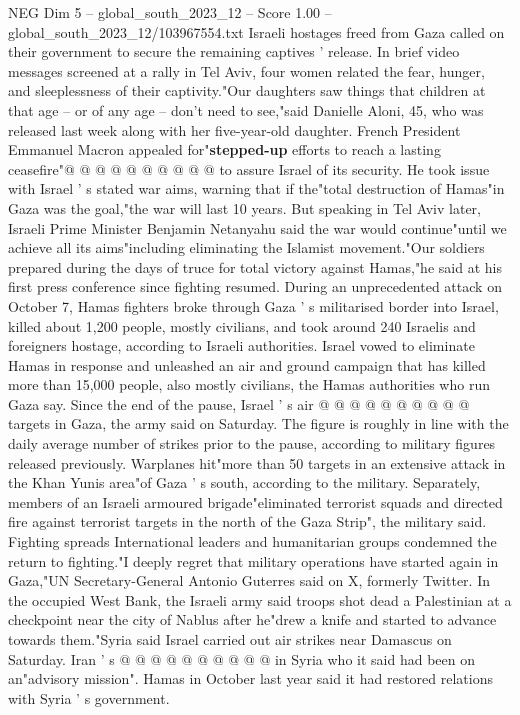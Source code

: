\begin{textsample}{NEG Dim 5 – global\_south\_2023\_12 – Score 1.00 – global\_south\_2023\_12/103967554.txt}
Israeli hostages freed from Gaza called on their government to secure the remaining captives ' release.
In brief video messages screened at a rally in Tel Aviv, four women related the fear, hunger, and sleeplessness of their captivity."Our daughters saw things that children at that age -- or of any age -- don't need to see,"said Danielle Aloni, 45, who was released last week along with her five-year-old daughter.
French President Emmanuel Macron appealed for"\textbf{stepped-up} efforts to reach a lasting ceasefire"@ @ @ @ @ @ @ @ @ @ to assure Israel of its security.
He took issue with Israel ' s stated war aims, warning that if the"total destruction of Hamas"in Gaza was the goal,"the war will last 10 years.
But speaking in Tel Aviv later, Israeli Prime Minister Benjamin Netanyahu said the war would continue"until we achieve all its aims"including eliminating the Islamist movement."Our soldiers prepared during the days of truce for total victory against Hamas,"he said at his first press conference since fighting resumed.
During an unprecedented attack on October 7, Hamas fighters broke through Gaza ' s militarised border into Israel, killed about 1,200 people, mostly civilians, and took around 240 Israelis and foreigners hostage, according to Israeli authorities.
Israel vowed to eliminate Hamas in response and unleashed an air and ground campaign that has killed more than 15,000 people, also mostly civilians, the Hamas authorities who run Gaza say.
Since the end of the pause, Israel ' s air @ @ @ @ @ @ @ @ @ @ targets in Gaza, the army said on Saturday.
The figure is roughly in line with the daily average number of strikes prior to the pause, according to military figures released previously.
Warplanes hit"more than 50 targets in an extensive attack in the Khan Yunis area"of Gaza ' s south, according to the military.
Separately, members of an Israeli armoured brigade"eliminated terrorist squads and directed fire against terrorist targets in the north of the Gaza Strip", the military said.
Fighting spreads International leaders and humanitarian groups condemned the return to fighting."I deeply regret that military operations have started again in Gaza,"UN Secretary-General Antonio Guterres said on X, formerly Twitter.
In the occupied West Bank, the Israeli army said troops shot dead a Palestinian at a checkpoint near the city of Nablus after he"drew a knife and started to advance towards them."Syria said Israel carried out air strikes near Damascus on Saturday.
Iran ' s @ @ @ @ @ @ @ @ @ @ in Syria who it said had been on an"advisory mission".
Hamas in October last year said it had restored relations with Syria ' s government.

\end{textsample}
